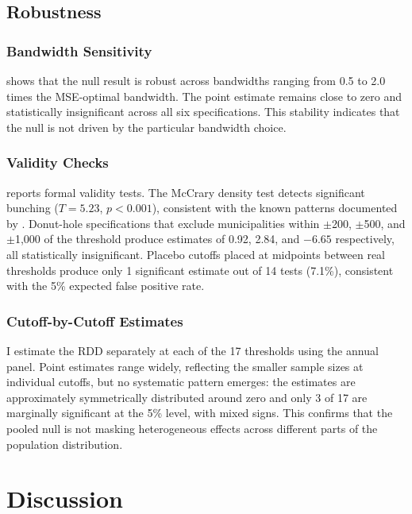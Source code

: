 \documentclass[12pt]{article}
\begin{document}
\subsection{Robustness}

\subsubsection*{Bandwidth Sensitivity}  shows that the null result is robust across bandwidths ranging from 0.5 to 2.0 times the MSE-optimal bandwidth. The point estimate remains close to zero and statistically insignificant across all six specifications. This stability indicates that the null is not driven by the particular bandwidth choice.



\subsubsection*{Validity Checks}  reports formal validity tests. The McCrary density test detects significant bunching ($T = 5.23$, $p < 0.001$), consistent with the known patterns documented by \citet{litschig2012internal}. Donut-hole specifications that exclude municipalities within $\pm$200, $\pm$500, and $\pm$1,000 of the threshold produce estimates of 0.92, 2.84, and $-6.65$ respectively, all statistically insignificant. Placebo cutoffs placed at midpoints between real thresholds produce only 1 significant estimate out of 14 tests (7.1\%), consistent with the 5\% expected false positive rate.



\subsubsection*{Cutoff-by-Cutoff Estimates} I estimate the RDD separately at each of the 17 thresholds using the annual panel. Point estimates range widely, reflecting the smaller sample sizes at individual cutoffs, but no systematic pattern emerges: the estimates are approximately symmetrically distributed around zero and only 3 of 17 are marginally significant at the 5\% level, with mixed signs. This confirms that the pooled null is not masking heterogeneous effects across different parts of the population distribution.

\section{Discussion}
\end{document}
